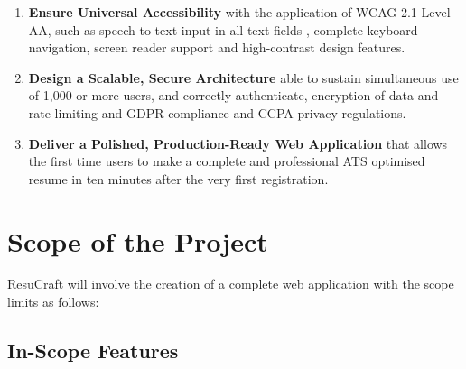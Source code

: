 \documentclass[12pt, a4paper, oneside]{report}
\begin{document}
\begin{enumerate}
    \item \textbf{Ensure Universal Accessibility} with the application of WCAG 2.1 Level AA, such as speech-to-text input in all text fields \cite{sears2003}, complete keyboard navigation, screen reader support and high-contrast design features\cite{wcag21}.

    \item \textbf{Design a Scalable, Secure Architecture} able to sustain simultaneous use of 1,000 or more users, and correctly authenticate\cite{pressman2014}\cite{oauth2012}, encryption of data and rate limiting and GDPR compliance\cite{gdpr2016} and CCPA \cite{ccpa2018} privacy regulations.

    \item \textbf{Deliver a Polished, Production-Ready Web Application} that allows the first time users to make a complete and professional ATS optimised resume in ten minutes after the very first registration.
\end{enumerate}

\section{Scope of the Project}

ResuCraft will involve the creation of a complete web application with the scope limits as follows:

\subsection{In-Scope Features}
\end{document}
